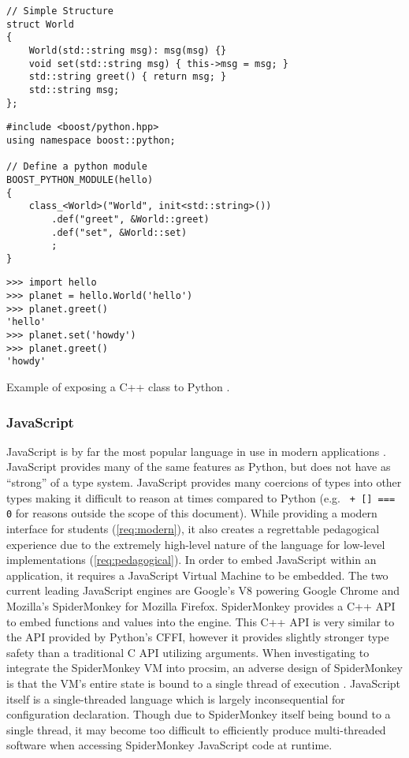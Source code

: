 \begin{listing}[hp!]
\begin{verbatim}
// Simple Structure
struct World
{
    World(std::string msg): msg(msg) {} 
    void set(std::string msg) { this->msg = msg; }
    std::string greet() { return msg; }
    std::string msg;
};
\end{verbatim}

\begin{verbatim}
#include <boost/python.hpp>
using namespace boost::python;

// Define a python module
BOOST_PYTHON_MODULE(hello)
{
    class_<World>("World", init<std::string>())
        .def("greet", &World::greet)
        .def("set", &World::set)
        ;
}
\end{verbatim}

\begin{verbatim}
>>> import hello
>>> planet = hello.World('hello')
>>> planet.greet()
'hello'
>>> planet.set('howdy')
>>> planet.greet()
'howdy'
\end{verbatim}
\caption{Example of exposing a C++ class to Python \cite{Boost1.53.0:Python}.}
\label{lst:lua:python-example}
\end{listing}

\subsubsection{JavaScript}

JavaScript is by far the most popular language in use in modern applications \cite{StackOverflowSurvey2016}. JavaScript provides many of the same features as Python, but does not have as ``strong'' of a type system. JavaScript provides many coercions of types into other types making it difficult to reason at times compared to Python (e.g. \texttt{{} + [] === 0} for reasons outside the scope of this document). While providing a modern interface for students (\cref{req:modern}), it also creates a regrettable pedagogical experience due to the extremely high-level nature of the language for low-level implementations (\cref{req:pedagogical}). In order to embed JavaScript within an application, it requires a JavaScript Virtual Machine to be embedded. The two current leading JavaScript engines are Google's V8 \cite{Google:V8} powering Google Chrome and Mozilla's SpiderMonkey \cite{MDN:SpiderMonkey} for Mozilla Firefox. SpiderMonkey provides a C++ API to embed functions and values into the engine. This C++ API is very similar to the API provided by Python's CFFI, however it provides slightly stronger type safety than a traditional C API utilizing  arguments. When investigating to integrate the SpiderMonkey VM into procsim, an adverse design of SpiderMonkey is that the VM's entire state is bound to a single thread of execution \cite{MDN:SpiderMonkey:UserGuide}. JavaScript itself is a single-threaded language which is largely inconsequential for configuration declaration. Though due to SpiderMonkey itself being bound to a single thread, it may become too difficult to efficiently produce multi-threaded software when accessing SpiderMonkey JavaScript code at runtime. 

